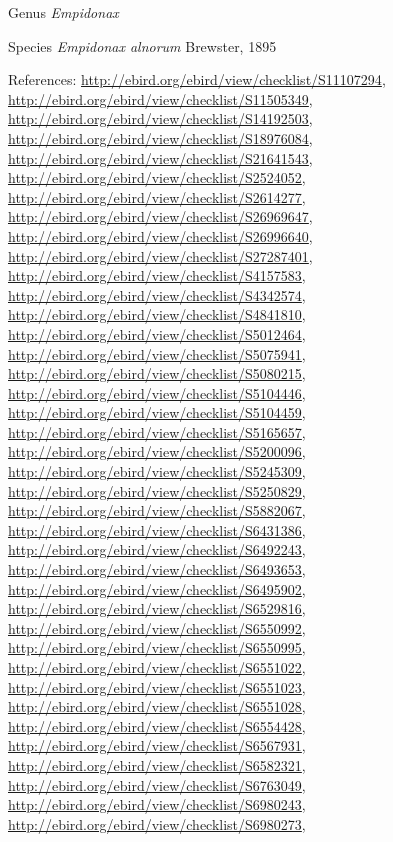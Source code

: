 \documentclass[9pt, article]{memoir}
\begin{document}
\begin{multicols}{2}
\vspace{6pt}\noindent\hspace{30pt}Genus \textit{Empidonax}


\vspace{6pt}\noindent\hspace{36pt}Species \textit{Empidonax alnorum} Brewster, 1895


\vspace{6pt}References: 
\url{http://ebird.org/ebird/view/checklist/S11107294}, 
\url{http://ebird.org/ebird/view/checklist/S11505349}, 
\url{http://ebird.org/ebird/view/checklist/S14192503}, 
\url{http://ebird.org/ebird/view/checklist/S18976084}, 
\url{http://ebird.org/ebird/view/checklist/S21641543}, 
\url{http://ebird.org/ebird/view/checklist/S2524052}, 
\url{http://ebird.org/ebird/view/checklist/S2614277}, 
\url{http://ebird.org/ebird/view/checklist/S26969647}, 
\url{http://ebird.org/ebird/view/checklist/S26996640}, 
\url{http://ebird.org/ebird/view/checklist/S27287401}, 
\url{http://ebird.org/ebird/view/checklist/S4157583}, 
\url{http://ebird.org/ebird/view/checklist/S4342574}, 
\url{http://ebird.org/ebird/view/checklist/S4841810}, 
\url{http://ebird.org/ebird/view/checklist/S5012464}, 
\url{http://ebird.org/ebird/view/checklist/S5075941}, 
\url{http://ebird.org/ebird/view/checklist/S5080215}, 
\url{http://ebird.org/ebird/view/checklist/S5104446}, 
\url{http://ebird.org/ebird/view/checklist/S5104459}, 
\url{http://ebird.org/ebird/view/checklist/S5165657}, 
\url{http://ebird.org/ebird/view/checklist/S5200096}, 
\url{http://ebird.org/ebird/view/checklist/S5245309}, 
\url{http://ebird.org/ebird/view/checklist/S5250829}, 
\url{http://ebird.org/ebird/view/checklist/S5882067}, 
\url{http://ebird.org/ebird/view/checklist/S6431386}, 
\url{http://ebird.org/ebird/view/checklist/S6492243}, 
\url{http://ebird.org/ebird/view/checklist/S6493653}, 
\url{http://ebird.org/ebird/view/checklist/S6495902}, 
\url{http://ebird.org/ebird/view/checklist/S6529816}, 
\url{http://ebird.org/ebird/view/checklist/S6550992}, 
\url{http://ebird.org/ebird/view/checklist/S6550995}, 
\url{http://ebird.org/ebird/view/checklist/S6551022}, 
\url{http://ebird.org/ebird/view/checklist/S6551023}, 
\url{http://ebird.org/ebird/view/checklist/S6551028}, 
\url{http://ebird.org/ebird/view/checklist/S6554428}, 
\url{http://ebird.org/ebird/view/checklist/S6567931}, 
\url{http://ebird.org/ebird/view/checklist/S6582321}, 
\url{http://ebird.org/ebird/view/checklist/S6763049}, 
\url{http://ebird.org/ebird/view/checklist/S6980243}, 
\url{http://ebird.org/ebird/view/checklist/S6980273}, 

\end{multicols}
\end{document}
